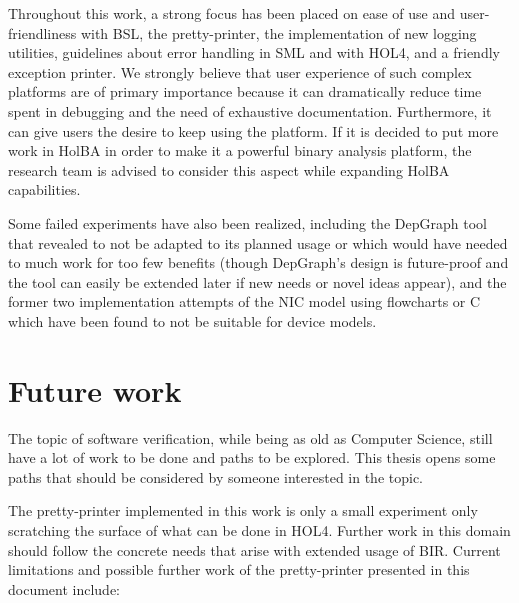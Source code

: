 \documentclass{kththesis}
\begin{document}
{Throughout this work, a strong focus has been placed on ease of use and user-friendliness with BSL, the pretty-printer, the implementation of new logging utilities, guidelines about error handling in SML and with HOL4, and a friendly exception printer. We strongly believe that user experience of such complex platforms are of primary importance because it can dramatically reduce time spent in debugging and the need of exhaustive documentation. Furthermore, it can give users the desire to keep using the platform. If it is decided to put more work in HolBA in order to make it a powerful binary analysis platform, the research team is advised to consider this aspect while expanding HolBA capabilities.

Some failed experiments have also been realized, including the DepGraph tool that revealed to not be adapted to its planned usage or which would have needed to much work for too few benefits (though DepGraph's design is future-proof and the tool can easily be extended later if new needs or novel ideas appear), and the former two implementation attempts of the NIC model using flowcharts or C which have been found to not be suitable for device models.

\section{Future work}

The topic of software verification, while being as old as Computer Science, still have a lot of work to be done and paths to be explored. This thesis opens some paths that should be considered by someone interested in the topic.

The pretty-printer implemented in this work is only a small experiment only scratching the surface of what can be done in HOL4. Further work in this domain should follow the concrete needs that arise with extended usage of BIR. Current limitations and possible further work of the pretty-printer presented in this document include:

}
\end{document}
